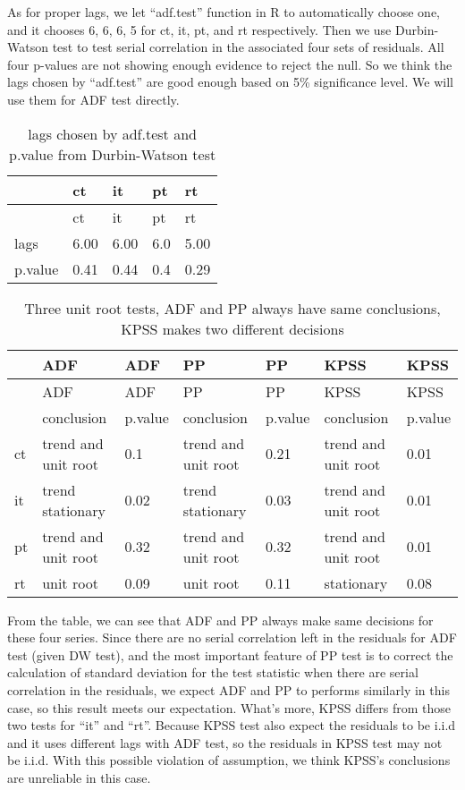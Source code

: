 \documentclass[10pt,]{article}
\begin{document}
As for proper lags, we let ``adf.test'' function in R to automatically
choose one, and it chooses 6, 6, 6, 5 for ct, it, pt, and rt
respectively. Then we use Durbin-Watson test to test serial correlation
in the associated four sets of residuals. All four p-values are not
showing enough evidence to reject the null. So we think the lags chosen
by ``adf.test'' are good enough based on 5\% significance level. We will
use them for ADF test directly.

\begin{longtable}[]{@{}lllll@{}}
\caption{lags chosen by adf.test and p.value from Durbin-Watson
test}\tabularnewline
\toprule
& ct & it & pt & rt\tabularnewline
\midrule
\endfirsthead
\toprule
& ct & it & pt & rt\tabularnewline
\midrule
\endhead
lags & 6.00 & 6.00 & 6.0 & 5.00\tabularnewline
p.value & 0.41 & 0.44 & 0.4 & 0.29\tabularnewline
\bottomrule
\end{longtable}

\begin{longtable}[]{@{}lllllll@{}}
\caption{Three unit root tests, ADF and PP always have same conclusions,
KPSS makes two different decisions}\tabularnewline
\toprule
& ADF & ADF & PP & PP & KPSS & KPSS\tabularnewline
\midrule
\endfirsthead
\toprule
& ADF & ADF & PP & PP & KPSS & KPSS\tabularnewline
\midrule
\endhead
& conclusion & p.value & conclusion & p.value & conclusion &
p.value\tabularnewline
ct & trend and unit root & 0.1 & trend and unit root & 0.21 & trend and
unit root & 0.01\tabularnewline
it & trend stationary & 0.02 & trend stationary & 0.03 & trend and unit
root & 0.01\tabularnewline
pt & trend and unit root & 0.32 & trend and unit root & 0.32 & trend and
unit root & 0.01\tabularnewline
rt & unit root & 0.09 & unit root & 0.11 & stationary &
0.08\tabularnewline
\bottomrule
\end{longtable}

From the table, we can see that ADF and PP always make same decisions
for these four series. Since there are no serial correlation left in the
residuals for ADF test (given DW test), and the most important feature
of PP test is to correct the calculation of standard deviation for the
test statistic when there are serial correlation in the residuals, we
expect ADF and PP to performs similarly in this case, so this result
meets our expectation. What's more, KPSS differs from those two tests
for ``it'' and ``rt''. Because KPSS test also expect the residuals to be
i.i.d and it uses different lags with ADF test, so the residuals in KPSS
test may not be i.i.d. With this possible violation of assumption, we
think KPSS's conclusions are unreliable in this case.
\end{document}
